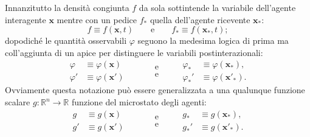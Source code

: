                 Innanzitutto la densità congiunta \(f\) da sola sottintende la variabile dell'agente interagente \(\mathbf x\) mentre con un pedice \(f_*\) quella dell'agente ricevente \(\mathbf x_*\):
                \newcommand\valtmp{2em}
                \begin{equation*}
                    \newcommand\hspc{\hspace{\valtmp}}
                    f\equiv f(\mathbf x,t)
                    \hspc\text{e}\hspc
                    f_*\equiv f(\mathbf x_*,t);
                \end{equation*}
                dopodiché le quantità osservabili \(\varphi\) seguono la medesima logica di prima ma coll'aggiunta di un apice per distinguere le variabili postinterazionali:
                \begin{equation*}
                    \newcommand\hspc{\hspace{\valtmp}}
                    \begin{aligned}
                        \varphi&\equiv\varphi(\mathbf x)\\
                        \varphi'&\equiv\varphi(\mathbf x')
                    \end{aligned}
                    \hspc
                    \begin{aligned}
                        &\text{e}\\
                        &\text{e}
                    \end{aligned}
                    \hspc
                    \begin{aligned}
                        \varphi_*&\equiv\varphi(\mathbf x_*),\\
                        \varphi_*'&\equiv\varphi(\mathbf x'_*).
                    \end{aligned}
                \end{equation*}
                Ovviamente questa notazione può essere generalizzata a una qualunque funzione scalare \(g\colon\mathbb R^n\to\mathbb R\) funzione del microstato degli agenti:
                \begin{equation*}
                    \newcommand\hspc{\hspace{\valtmp}}
                    \begin{aligned}
                        g&\equiv g(\mathbf x)\\
                        g'&\equiv g(\mathbf x')
                    \end{aligned}
                    \hspc
                    \begin{aligned}
                        &\text{e}\\
                        &\text{e}
                    \end{aligned}
                    \hspc
                    \begin{aligned}
                        g_*&\equiv g(\mathbf x_*),\\
                        g_*'&\equiv g(\mathbf x'_*).
                    \end{aligned}
                \end{equation*}
